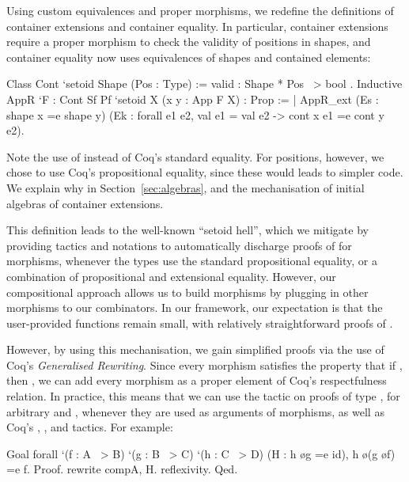\documentclass{llncs}
\begin{document}
Using custom equivalences and proper morphisms, we redefine the definitions of
container extensions and container equality. In particular, container
extensions require a proper morphism to check the validity of positions in
shapes, and container equality now uses equivalences of shapes and contained
elements: 
\begin{coqcode}
Class Cont `{setoid Shape} (Pos : Type) := { valid : Shape * Pos ~> bool }.
Inductive AppR `{F : Cont Sf Pf} `{setoid X} (x y : App F X) : Prop :=
  | AppR_ext (Es : shape x =e shape y)
             (Ek : forall e1 e2, val e1 = val e2 -> cont x e1 =e cont y e2).
\end{coqcode}
Note the use of  instead of Coq's standard equality.  For positions,
however, we chose to use Coq's propositional equality, since these would leads
to simpler code. We explain why in Section~\ref{sec:algebras}, and the
mechanisation of initial algebras of container extensions.

This definition leads to the well-known ``setoid hell'', which we mitigate by
providing tactics and notations to automatically discharge proofs of
 for morphisms, whenever the types use the standard propositional
equality, or a combination of propositional and extensional equality. However,
our compositional approach allows us to build morphisms by plugging in other
morphisms to our combinators. In our framework, our expectation is that the
user-provided functions remain small, with relatively straightforward proofs of
.

However, by using this mechanisation, we gain simplified proofs via the use of
Coq's \emph{Generalised Rewriting}. Since every morphism 
satisfies the property that if , then , we can add
every morphism as a proper element of Coq's respectfulness relation. In
practice, this means that we can use the  tactic on proofs of
type , for arbitrary  and , whenever they are used as
arguments of morphisms, as well as Coq's , ,
and  tactics. For example:
\begin{coqcode}
Goal forall `(f : A ~> B) `(g : B ~> C) `(h : C ~> D) (H : h \o g =e id), 
  h \o (g \o f) =e f.
Proof.  rewrite compA, H.  reflexivity. Qed.
\end{coqcode}
\end{document}
